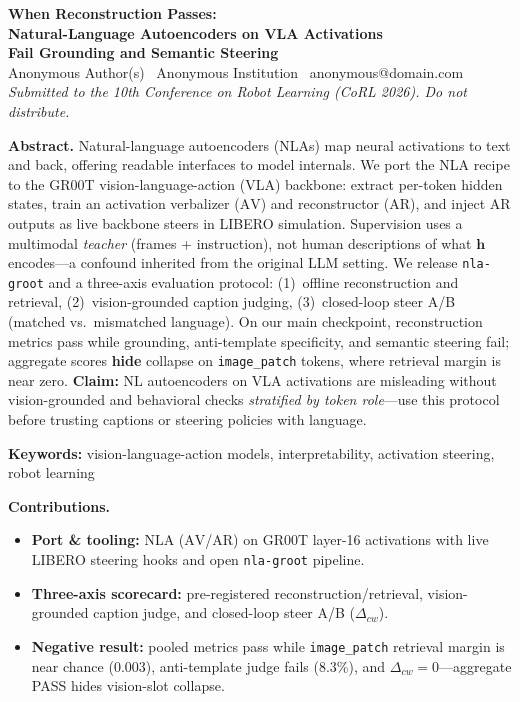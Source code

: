 \documentclass[10pt]{article}
\newcommand{\AV}{\ensuremath{\mathrm{AV}}}
\newcommand{\AR}{\ensuremath{\mathrm{AR}}}
\newcommand{\hvec}{\mathbf{h}}
\newcommand{\code}[1]{\texttt{\small #1}}
\begin{document}
\begin{center}
  {\LARGE\bfseries When Reconstruction Passes:\\[0.15em]
  Natural-Language Autoencoders on VLA Activations\\
  Fail Grounding and Semantic Steering}\\[0.6em]
  {\normalsize Anonymous Author(s) \textbar\ Anonymous Institution \textbar\ anonymous@domain.com}\\[0.15em]
  {\small\textit{Submitted to the 10th Conference on Robot Learning (CoRL 2026). Do not distribute.}}
\end{center}

\vspace{0.4em}
\noindent\textbf{Abstract.}\quad
Natural-language autoencoders (NLAs) map neural activations to text and back,
offering readable interfaces to model internals.
We port the NLA recipe to the GR00T vision-language-action (VLA) backbone:
extract per-token hidden states, train an activation verbalizer (\AV) and
reconstructor (\AR), and inject \AR{} outputs as live backbone steers in
LIBERO simulation.
Supervision uses a multimodal \emph{teacher} (frames + instruction), not
human descriptions of what \(\hvec\) encodes---a confound inherited from the
original LLM setting.
We release \code{nla-groot} and a three-axis evaluation protocol:
(1)~offline reconstruction and retrieval,
(2)~vision-grounded caption judging,
(3)~closed-loop steer A/B (matched vs.\ mismatched language).
On our main checkpoint, reconstruction metrics pass while grounding,
anti-template specificity, and semantic steering fail; aggregate scores
\textbf{hide} collapse on \code{image\_patch} tokens, where retrieval
margin is near zero.
\textbf{Claim:} NL autoencoders on VLA activations are misleading without
vision-grounded and behavioral checks \emph{stratified by token role}---use
this protocol before trusting captions or steering policies with language.

\vspace{0.25em}
\noindent\textbf{Keywords:} vision-language-action models, interpretability, activation steering, robot learning

\vspace{0.35em}
\noindent\textbf{Contributions.}
\begin{itemize}
  \item \textbf{Port \& tooling:} NLA (\AV{}/\AR{}) on GR00T layer-16 activations with live LIBERO steering hooks and open \code{nla-groot} pipeline.
  \item \textbf{Three-axis scorecard:} pre-registered reconstruction/retrieval, vision-grounded caption judge, and closed-loop steer A/B (\(\Delta_{cw}\)).
  \item \textbf{Negative result:} pooled metrics pass while \code{image\_patch} retrieval margin is near chance (0.003), anti-template judge fails (8.3\%), and \(\Delta_{cw}=0\)---aggregate PASS hides vision-slot collapse.
\end{itemize}
\end{document}
